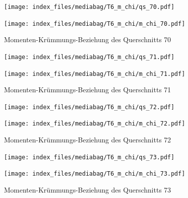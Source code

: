\documentclass[
  11pt,
  letterpaper,
]{scrreprt}
\begin{document}
\begin{figure}[H]

\begin{minipage}{0.50\linewidth}
\texttt{[image: index\_files/mediabag/T6\_m\_chi/qs\_70.pdf]}\end{minipage}%
%
\begin{minipage}{0.50\linewidth}
\texttt{[image: index\_files/mediabag/T6\_m\_chi/m\_chi\_70.pdf]}\end{minipage}%

\caption{\label{fig-mchi_anhang}Momenten-Krümmungs-Beziehung des
Querschnitts 70}

\end{figure}%

\begin{figure}[H]

\begin{minipage}{0.50\linewidth}
\texttt{[image: index\_files/mediabag/T6\_m\_chi/qs\_71.pdf]}\end{minipage}%
%
\begin{minipage}{0.50\linewidth}
\texttt{[image: index\_files/mediabag/T6\_m\_chi/m\_chi\_71.pdf]}\end{minipage}%

\caption{\label{fig-mchi_anhang}Momenten-Krümmungs-Beziehung des
Querschnitts 71}

\end{figure}%

\begin{figure}[H]

\begin{minipage}{0.50\linewidth}
\texttt{[image: index\_files/mediabag/T6\_m\_chi/qs\_72.pdf]}\end{minipage}%
%
\begin{minipage}{0.50\linewidth}
\texttt{[image: index\_files/mediabag/T6\_m\_chi/m\_chi\_72.pdf]}\end{minipage}%

\caption{\label{fig-mchi_anhang}Momenten-Krümmungs-Beziehung des
Querschnitts 72}

\end{figure}%

\begin{figure}[H]

\begin{minipage}{0.50\linewidth}
\texttt{[image: index\_files/mediabag/T6\_m\_chi/qs\_73.pdf]}\end{minipage}%
%
\begin{minipage}{0.50\linewidth}
\texttt{[image: index\_files/mediabag/T6\_m\_chi/m\_chi\_73.pdf]}\end{minipage}%

\caption{\label{fig-mchi_anhang}Momenten-Krümmungs-Beziehung des
Querschnitts 73}

\end{figure}%
\end{document}
